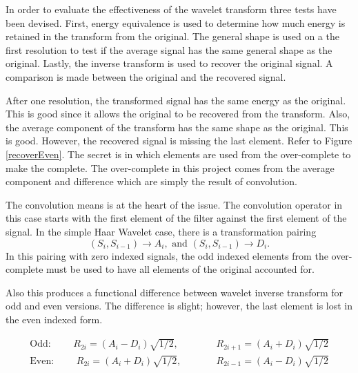 In order to evaluate the effectiveness of the wavelet transform three tests have been devised.  First,  energy equivalence is used to determine how much energy is retained in the transform from the original.    The general shape is used on a the first resolution to test if the average signal has the same general shape as the original.  Lastly, the inverse transform is used to recover the original signal.  A comparison is made between the original and the recovered signal.  

After one resolution, the transformed signal has the same energy as the original.  This is good since it allows the original to be recovered from the transform.  Also, the average component of the transform has the same shape as the original.  This is good.  However, the recovered signal is missing the last element.  Refer to Figure \ref{recoverEven}. The secret is in which elements are used from the over-complete to make the complete.  The over-complete in this project comes from the average component and difference which are simply the result of convolution.  

The convolution means is at the heart of the issue.  The convolution operator in this case starts with the first element of the filter against the first element of the signal.  In the simple Haar Wavelet case, there is a transformation pairing
\[
(S_i , S_{i-1}) \rightarrow A_i, \mbox{ and } (S_i , S_{i-1}) \rightarrow D_i .
\]
In this pairing with zero indexed signals, the odd indexed elements from the over-complete must be used to have all elements of the original accounted for.   

Also this produces a functional difference between wavelet inverse transform for odd and even versions.  The difference is slight; however, the last element is lost in the even indexed form.  

\begin{eqnarray*}
\mbox{Odd: } \qquad R_{2i} =(A_i - D_i ) \sqrt{1/2}, &\qquad& R_{2i+1}=(A_i + D_i ) \sqrt{1/2} \\
\mbox{Even: } \qquad R_{2i} =(A_i + D_i ) \sqrt{1/2}, &\qquad& R_{2i-1}=(A_i - D_i ) \sqrt{1/2} 
\end{eqnarray*}


